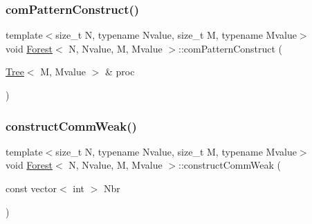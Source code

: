 \mbox{\label{classForest_ac2240e70c0c725c8720f2d634fdd56e5}} 
\subsubsection{\texorpdfstring{com\+Pattern\+Construct()}{comPatternConstruct()}}
{\footnotesize\ttfamily template$<$size\+\_\+t N, typename Nvalue, size\+\_\+t M, typename Mvalue$>$ \\
void \mbox{\hyperlink{classForest}{Forest}}$<$ N, Nvalue, M, Mvalue $>$\+::com\+Pattern\+Construct (\begin{DoxyParamCaption}\item[{\mbox{\hyperlink{classTree}{Tree}}$<$ M, Mvalue $>$ \&}]{proc }\end{DoxyParamCaption})}

\mbox{\label{classForest_a6bbe4fa1ffa7fbc96fdbca3b98dcb690}} 
\subsubsection{\texorpdfstring{construct\+Comm\+Weak()}{constructCommWeak()}}
{\footnotesize\ttfamily template$<$size\+\_\+t N, typename Nvalue, size\+\_\+t M, typename Mvalue$>$ \\
void \mbox{\hyperlink{classForest}{Forest}}$<$ N, Nvalue, M, Mvalue $>$\+::construct\+Comm\+Weak (\begin{DoxyParamCaption}\item[{const vector$<$ int $>$}]{Nbr }\end{DoxyParamCaption})}

\mbox{\label{classForest_a36659b1ce85c0da6ea9e0c6abbfcd939}} 
